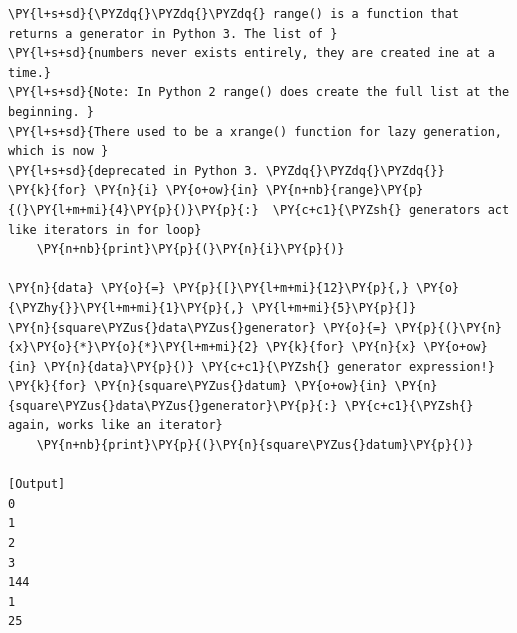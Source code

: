 \begin{Verbatim}[label=\makebox{\url{https://github.com/lucabaldini/cmepda/tree/master/slides/latex/snippets/generators.py}},commandchars=\\\{\}]
\PY{l+s+sd}{\PYZdq{}\PYZdq{}\PYZdq{} range() is a function that returns a generator in Python 3. The list of }
\PY{l+s+sd}{numbers never exists entirely, they are created ine at a time.}
\PY{l+s+sd}{Note: In Python 2 range() does create the full list at the beginning. }
\PY{l+s+sd}{There used to be a xrange() function for lazy generation, which is now }
\PY{l+s+sd}{deprecated in Python 3. \PYZdq{}\PYZdq{}\PYZdq{}}
\PY{k}{for} \PY{n}{i} \PY{o+ow}{in} \PY{n+nb}{range}\PY{p}{(}\PY{l+m+mi}{4}\PY{p}{)}\PY{p}{:}  \PY{c+c1}{\PYZsh{} generators act like iterators in for loop}
    \PY{n+nb}{print}\PY{p}{(}\PY{n}{i}\PY{p}{)}

\PY{n}{data} \PY{o}{=} \PY{p}{[}\PY{l+m+mi}{12}\PY{p}{,} \PY{o}{\PYZhy{}}\PY{l+m+mi}{1}\PY{p}{,} \PY{l+m+mi}{5}\PY{p}{]}
\PY{n}{square\PYZus{}data\PYZus{}generator} \PY{o}{=} \PY{p}{(}\PY{n}{x}\PY{o}{*}\PY{o}{*}\PY{l+m+mi}{2} \PY{k}{for} \PY{n}{x} \PY{o+ow}{in} \PY{n}{data}\PY{p}{)} \PY{c+c1}{\PYZsh{} generator expression!}
\PY{k}{for} \PY{n}{square\PYZus{}datum} \PY{o+ow}{in} \PY{n}{square\PYZus{}data\PYZus{}generator}\PY{p}{:} \PY{c+c1}{\PYZsh{} again, works like an iterator}
    \PY{n+nb}{print}\PY{p}{(}\PY{n}{square\PYZus{}datum}\PY{p}{)}

[Output]
0
1
2
3
144
1
25
\end{Verbatim}